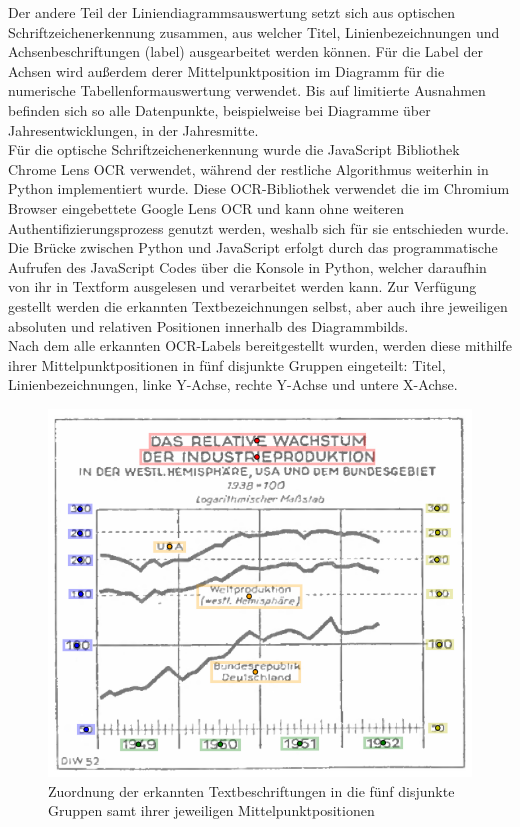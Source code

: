 Der andere Teil der Liniendiagrammsauswertung setzt sich aus optischen Schriftzeichenerkennung zusammen, aus welcher Titel, Linienbezeichnungen und Achsenbeschriftungen (label) ausgearbeitet werden können. Für die Label der Achsen wird außerdem derer Mittelpunktposition im Diagramm für die numerische Tabellenformauswertung verwendet. Bis auf limitierte Ausnahmen befinden sich so alle Datenpunkte, beispielweise bei Diagramme über Jahresentwicklungen, in der Jahresmitte.
\\
Für die optische Schriftzeichenerkennung wurde die JavaScript Bibliothek Chrome Lens OCR \cite{dimden2024chromelensocr} verwendet, während der restliche Algorithmus weiterhin in Python implementiert wurde. Diese OCR-Bibliothek verwendet die im Chromium Browser eingebettete Google Lens OCR und kann ohne weiteren Authentifizierungsprozess genutzt werden, weshalb sich für sie entschieden wurde. Die Brücke zwischen Python und JavaScript erfolgt durch das programmatische Aufrufen des JavaScript Codes über die Konsole in Python, welcher daraufhin von ihr in Textform ausgelesen und verarbeitet werden kann. Zur Verfügung gestellt werden die erkannten Textbezeichnungen selbst, aber auch ihre jeweiligen absoluten und relativen Positionen innerhalb des Diagrammbilds.
\\
Nach dem alle erkannten OCR-Labels bereitgestellt wurden, werden diese mithilfe ihrer Mittelpunktpositionen in fünf disjunkte Gruppen eingeteilt: Titel, Linienbezeichnungen, linke Y-Achse, rechte Y-Achse und untere X-Achse.

\begin{figure}[H]
    \centering
    \captionsetup{width=.75\linewidth}
    \includegraphics[width=.75\textwidth]{Implementation/img/ocr.png}
    \caption{ Zuordnung der erkannten Textbeschriftungen in die fünf disjunkte Gruppen samt ihrer jeweiligen Mittelpunktpositionen}
    \label{fig:ocr}
\end{figure}

